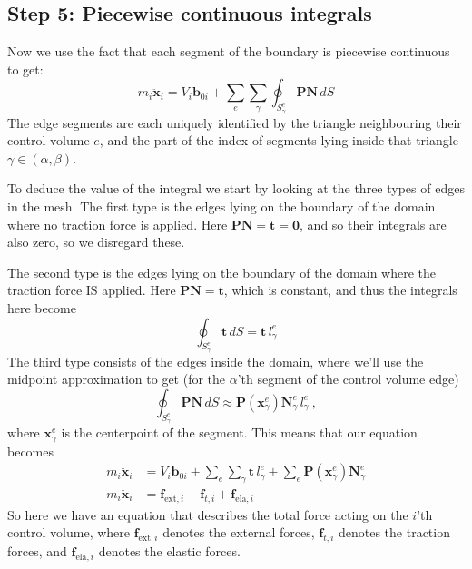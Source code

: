 \documentclass[acmtog]{acmart}
\begin{document}
\subsection*{Step 5: Piecewise continuous integrals}
Now we use the fact that each segment of the boundary is piecewise continuous to get:
%
\begin{equation}
  m_i \ddot{\boldsymbol x}_i = V_i \boldsymbol b_{0i} + \sum_e \sum_\gamma \oint_{S_\gamma^e}\boldsymbol P \boldsymbol N \, dS
\end{equation}
%
The edge segments are each uniquely identified by the triangle neighbouring their control volume $e$, and the part of the index of segments lying inside that triangle $\gamma \in (\alpha, \beta)$.

To deduce the value of the integral we start by looking at the three types of edges in the mesh. The first type is the edges lying on the boundary of the domain where no traction force is applied. Here $\boldsymbol P \boldsymbol N = \boldsymbol t = \boldsymbol 0$, and so their integrals are also zero, so we disregard these.

The second type is the edges lying on the boundary of the domain where the traction force IS applied. Here $\boldsymbol P \boldsymbol N = \boldsymbol t$, which is constant, and thus the integrals here become
%
\begin{equation}
  \oint_{S_\gamma^e} \boldsymbol t \, dS = \boldsymbol t \,l_\gamma^e
\end{equation}
%
The third type consists of the edges inside the domain, where we'll use the midpoint approximation to get (for the $\alpha$'th segment of the control volume edge)
%
\begin{equation}
  \oint_{S_\gamma^e} \boldsymbol P \boldsymbol N \, dS \approx \boldsymbol P(\boldsymbol x_\gamma^e) \boldsymbol N_\gamma^e \, l_\gamma^e \ ,
\end{equation}
%
where $\boldsymbol x_\gamma^e$ is the centerpoint of the segment. This means that our equation becomes
%
\begin{align}
  m_i \ddot{\boldsymbol x}_i & = V_i \boldsymbol b_{0i} +  \sum_e \sum_\gamma \boldsymbol t \, l_\gamma^e + \sum_e \boldsymbol P(\boldsymbol x_\gamma^e) \boldsymbol N_\gamma^e \\
  m_i \ddot{\boldsymbol x}_i & = \boldsymbol f_{\mathrm{ext}, i} + \boldsymbol f_{t,i} + \boldsymbol f_{\mathrm{ela},i}
\end{align}
%
So here we have an equation that describes the total force acting on the $i$'th control volume, where $\boldsymbol f_{\mathrm{ext},i}$ denotes the external forces, $\boldsymbol f_{t,i}$ denotes the traction forces, and $\boldsymbol f_{\mathrm{ela},i}$ denotes the elastic forces.
\end{document}

